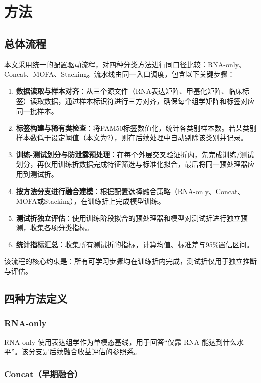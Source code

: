 \section{方法}

\subsection{总体流程}

本文采用统一的配置驱动流程，对四种分类方法进行同口径比较：RNA-only、Concat、MOFA、Stacking。流水线由同一入口调度，包含以下关键步骤：

\begin{enumerate}
    \item \textbf{数据读取与样本对齐}：从三个源文件（RNA表达矩阵、甲基化矩阵、临床标签）读取数据，通过样本标识符进行三方对齐，确保每个组学矩阵和标签对应同一批样本。
    \item \textbf{标签构建与稀有类检查}：将PAM50标签数值化，统计各类别样本数。若某类别样本数低于设定阈值（本文为2），则在后续处理中自动剔除该类别并记录。
    \item \textbf{训练-测试划分与防泄露预处理}：在每个外层交叉验证折内，先完成训练/测试划分，再仅用训练折数据完成特征筛选与标准化拟合，最后将同一预处理器应用到测试折。
    \item \textbf{按方法分支进行融合建模}：根据配置选择融合策略（RNA-only、Concat、MOFA或Stacking），在训练折上完成模型训练。
    \item \textbf{测试折独立评估}：使用训练阶段拟合的预处理器和模型对测试折进行独立预测，收集各项分类指标。
    \item \textbf{统计指标汇总}：收集所有测试折的指标，计算均值、标准差与95\%置信区间。
\end{enumerate}

该流程的核心约束是：所有可学习步骤均在训练折内完成，测试折仅用于独立推断与评估。

\subsection{四种方法定义}

\subsubsection{RNA-only}

RNA-only 使用表达组学作为单模态基线，用于回答“仅靠 RNA 能达到什么水平”。该分支是后续融合收益评估的参照系。

\subsubsection{Concat（早期融合）}

